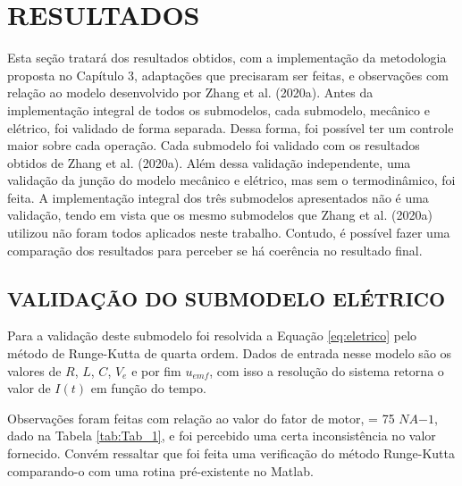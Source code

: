 \chapter{RESULTADOS}


Esta seção tratará dos resultados obtidos, com a implementação da metodologia proposta no Capítulo 3, adaptações que precisaram ser feitas, e observações com relação ao modelo desenvolvido por Zhang et al. (2020a).
Antes da implementação integral de todos os submodelos, cada submodelo, mecânico e elétrico,  foi validado de forma separada. Dessa forma, foi possível ter um controle maior sobre cada operação. Cada submodelo foi validado com os resultados obtidos de Zhang et al. (2020a). Além dessa validação independente, uma validação da junção do modelo mecânico e elétrico, mas sem o termodinâmico, foi feita.
A implementação integral dos três submodelos apresentados não é uma validação, tendo em vista que os mesmo submodelos que Zhang et al. (2020a) utilizou não foram todos aplicados neste trabalho. Contudo, é possível fazer uma comparação dos resultados para perceber se há coerência no resultado final.   
	
\section{VALIDAÇÃO DO SUBMODELO ELÉTRICO}
				
Para a validação deste submodelo foi resolvida a Equação \ref{eq:eletrico} pelo método de Runge-Kutta de quarta ordem. Dados de entrada nesse modelo são os valores de $R$, $L$, $C$, $V_e$ e por fim $u_{emf}$, com isso a resolução do sistema retorna o valor de $I(t)$ em função do tempo.

Observações foram feitas com relação ao valor do fator de motor,  = 75 $NA{-1}$, dado na Tabela \ref{tab:Tab_1}, e foi percebido uma certa inconsistência no valor fornecido. 
Convém ressaltar que foi feita uma verificação do método Runge-Kutta comparando-o com uma rotina pré-existente no Matlab. 




